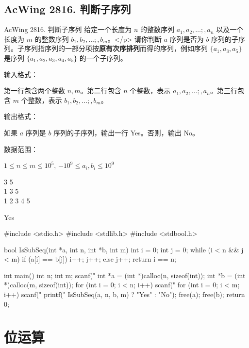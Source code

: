 \subsection{AcWing 2816. 判断子序列}
\begin{titledbox}{AcWing 2816. 判断子序列}
给定一个长度为 $n$ 的整数序列 $a_1,a_2,\dots;,a_n$ 以及一个长度为 $m$ 的整数序列 $b_1,b_2,\dots;,b_m$。</p>
请你判断 $a$ 序列是否为 $b$ 序列的子序列。子序列指序列的一部分项按\textbf{原有次序排列}而得的序列，例如序列 $\{a_1,a_3,a_5\}$ 是序列 $\{a_1,a_2,a_3,a_4,a_5\}$ 的一个子序列。

输入格式：

第一行包含两个整数 $n,m$。第二行包含 $n$ 个整数，表示 $a_1,a_2,\dots;,a_n$。第三行包含 $m$ 个整数，表示 $b_1,b_2,\dots;,b_m$。

输出格式：

如果 $a$ 序列是 $b$ 序列的子序列，输出一行 Yes。否则，输出 No。

数据范围：

$1 \le n \le m \le 10^5$, $-10^9 \le a_i,b_i \le 10^9$

\begin{inputblock}
    3 5 \\
    1 3 5 \\
    1 2 3 4 5
\end{inputblock}
\begin{outputblock}
    Yes
\end{outputblock}
\end{titledbox}

\begin{mycpptwocol}[判断子序列]
#include <stdio.h>
#include <stdlib.h>
#include <stdbool.h>

bool IsSubSeq(int *a, int n, int *b, int m)
{
    int i = 0;
    int j = 0;
    while (i < n && j < m) {
        if (a[i] == b[j]) {
            i++;
            j++;
        } else {
            j++;
        }
    }
    return i == n;
}

int main()
{
    int n;
    int m;
    scanf("%
    int *a = (int *)calloc(n, sizeof(int));
    int *b = (int *)calloc(m, sizeof(int));
    for (int i = 0; i < n; i++) {
        scanf("%
    }
    for (int i = 0; i < m; i++) {
        scanf("%
    }
    printf("%
      IsSubSeq(a, n, b, m) ? "Yes" : "No");
    free(a);
    free(b);
    return 0;
}
\end{mycpptwocol}
\section{位运算}
